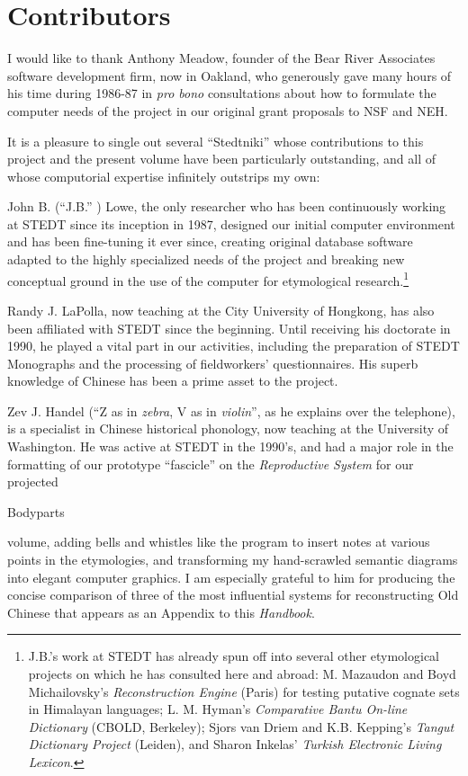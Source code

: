 \section{Contributors}

I would like to thank Anthony Meadow, founder of the Bear River Associates software development firm, now in Oakland, who generously gave many hours of his time during 1986-87 in {\it pro bono} consultations about how to formulate the computer needs of the project in our original grant proposals to NSF and NEH. 

It is a pleasure to single out several ``Stedtniki''  whose contributions to this project and the present volume have been particularly outstanding, and all of whose computorial expertise infinitely outstrips my own:
\begin{itemize}
\item John B. (``J.B.'' ) Lowe, the only researcher who has been continuously working at STEDT since its inception in 1987, designed our initial computer environment and has been fine-tuning it ever since, creating original database software adapted to the highly specialized needs of the project and breaking new conceptual ground in the use of the computer for etymological research.\footnote{J.B.'s work at STEDT has already spun off into several other etymological projects on which he has consulted here and abroad: M. Mazaudon and Boyd Michailovsky's {\it Reconstruction Engine} (Paris) for testing putative cognate sets in Himalayan languages; L. M. Hyman's {\it Comparative Bantu On-line Dictionary} (CBOLD, Berkeley); Sjors van Driem and K.B. Kepping's {\it Tangut Dictionary Project} (Leiden), and Sharon Inkelas'  {\it Turkish Electronic Living Lexicon}.}
\item Randy J. LaPolla, now teaching at the City University of Hongkong, has also been affiliated with STEDT since the beginning. Until receiving his doctorate in 1990, he played a vital part in our activities, including the preparation of STEDT Monographs and the processing of fieldworkers' questionnaires. His superb knowledge of Chinese has been a prime asset to the project.
\item Zev J. Handel (``Z as in {\it zebra}, V as in {\it violin}'', as he explains over the telephone), is a specialist in Chinese historical phonology, now teaching at the University of Washington. He was active at STEDT in the 1990's, and had a major role in the formatting of our prototype ``fascicle''  on the {\it Reproductive System} for our projected {\item Bodyparts} volume, adding bells and whistles like the program to insert notes at various points in the etymologies, and transforming my hand-scrawled semantic diagrams into elegant computer graphics. I am especially grateful to him for producing the concise comparison of three of the most influential systems for reconstructing Old Chinese that appears as an Appendix to this {\it Handbook}.
\end{itemize}

